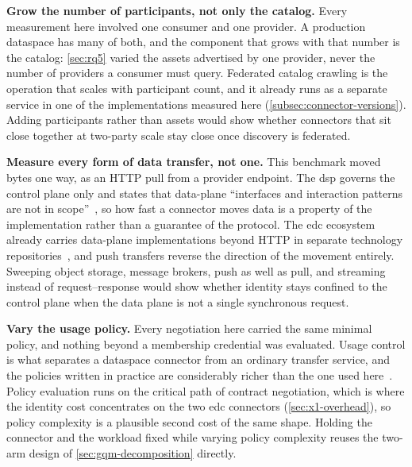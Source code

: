 \textbf{Grow the number of participants, not only the catalog.} Every measurement here
involved one consumer and one provider. A production dataspace has many of both, and the
component that grows with that number is the catalog: \cref{sec:rq5} varied the assets
advertised by one provider, never the number of providers a consumer must query. Federated
catalog crawling is the operation that scales with participant count, and it already runs as
a separate service in one of the implementations measured here
(\cref{subsec:connector-versions}). Adding participants rather than assets would show whether
connectors that sit close together at two-party scale stay close once discovery is federated.

\textbf{Measure every form of data transfer, not one.} This benchmark moved bytes one way, as
an HTTP pull from a provider endpoint. The \gls{dsp} governs the control plane only and states
that data-plane ``interfaces and interaction patterns are not in scope''~\citep{datapsaceProtocol2025},
so how fast a connector moves data is a property of the implementation rather than a guarantee
of the protocol. The \gls{edc} ecosystem already carries data-plane implementations beyond
HTTP in separate technology repositories~\citep{eclipseEdcTechnologyAws}, and push transfers
reverse the direction of the movement entirely. Sweeping object storage, message brokers, push
as well as pull, and streaming instead of request--response would show whether identity stays
confined to the control plane when the data plane is not a single synchronous request.

\textbf{Vary the usage policy.} Every negotiation here carried the same minimal policy, and
nothing beyond a membership credential was evaluated. Usage control is what separates a
dataspace connector from an ordinary transfer service, and the policies written in practice
are considerably richer than the one used here~\citep{dam2023policypatterns}. Policy
evaluation runs on the critical path of contract negotiation, which is where the identity cost
concentrates on the two \gls{edc} connectors (\cref{sec:x1-overhead}), so policy complexity is
a plausible second cost of the same shape. Holding the connector and the workload fixed while
varying policy complexity reuses the two-arm design of \cref{sec:gqm-decomposition} directly.
